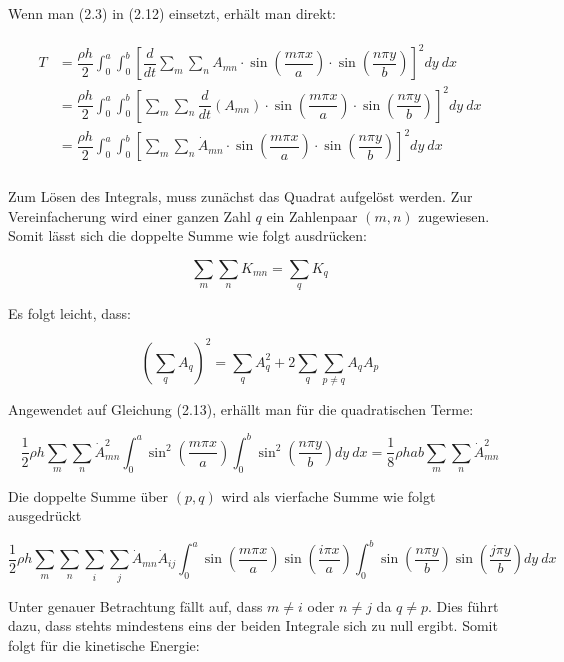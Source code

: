 Wenn man (2.3) in (2.12) einsetzt, erhält man direkt:

\begin{align}
\begin{split}
T &= \dfrac{\rho h}{2} \int_0^a \int_0^b  \left[\dfrac{d}{dt} \sum_m \sum_n A_{mn} \cdot \sin\left(\dfrac{m \pi x}{a}\right) \cdot \sin\left(\dfrac{n \pi y}{b}\right) \right]^2 dy \ dx  \\
&= \dfrac{\rho h}{2} \int_0^a \int_0^b  \left[ \sum_m \sum_n \dfrac{d}{dt}\left(A_{mn}\right) \cdot \sin\left(\dfrac{m \pi x}{a}\right) \cdot \sin\left(\dfrac{n \pi y}{b}\right) \right]^2 dy \ dx \\
&= \dfrac{\rho h}{2} \int_0^a \int_0^b  \left[ \sum_m \sum_n \dot{A}_{mn} \cdot \sin\left(\dfrac{m \pi x}{a}\right) \cdot \sin\left(\dfrac{n \pi y}{b}\right) \right]^2 dy \ dx \\
\end{split}
\end{align}

Zum Lösen des Integrals, muss zunächst das Quadrat aufgelöst werden. Zur Vereinfacherung wird einer ganzen Zahl $q$ ein Zahlenpaar $(m,n)$ zugewiesen.
Somit lässt sich die doppelte Summe wie folgt ausdrücken:

$$\sum_m\sum_n K_{mn}=\sum_q K_q$$

Es folgt leicht, dass:

$$\left(\sum_qA_q\right)^2=\sum_qA^2_q+2\sum_q\sum_{p\neq q}A_qA_p$$


Angewendet auf Gleichung (2.13), erhällt man für die quadratischen Terme:

\begin{equation}
\dfrac{1}{2}\rho h \sum_m\sum_n \dot{A}^2_{mn}\int_0^a\sin^2\left(\dfrac{m\pi x}{a}\right)\int_0^b\sin^2\left(\dfrac{n\pi y}{b}\right) dy \ dx=\dfrac{1}{8}\rho h a b\sum_m\sum_n \dot{A}^2_{mn}
\end{equation}

Die doppelte Summe über $(p,q)$ wird als vierfache Summe wie folgt ausgedrückt

\begin{equation}
\dfrac{1}{2}\rho h \sum_m\sum_n\sum_i\sum_j \dot{A}_{mn}\dot{A}_{ij}\int_0^a\sin\left(\dfrac{m\pi x}{a}\right)\sin\left(\dfrac{i\pi x}{a}\right)\int_0^b\sin\left(\dfrac{n\pi y}{b}\right)\sin\left(\dfrac{j\pi y}{b}\right) dy \ dx
\end{equation}

Unter genauer Betrachtung fällt auf, dass $m\neq i$ oder $n\neq j$ da $q\neq p$. Dies führt dazu, dass stehts mindestens eins der beiden Integrale sich zu null ergibt. Somit folgt für die kinetische Energie:

